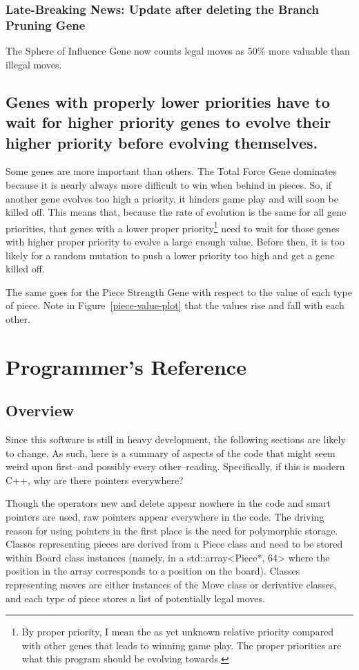 \documentclass[letterpaper]{article}
\newcommand{\cpp}{C{\nobreak +}{\nobreak +}}
\newcommand{\code}[1]{\textsf{#1}}
\renewcommand{\_}{\allowbreak\textunderscore\allowbreak}
\begin{document}
\subsubsection{Late-Breaking News: Update after deleting the Branch Pruning Gene}
The Sphere of Influence Gene now counts legal moves as 50\% more valuable than illegal moves.

\subsection{Genes with properly lower priorities have to wait for higher priority genes to evolve their higher priority before evolving themselves.}
\label{lower-priority-waits}

Some genes are more important than others. The Total Force Gene dominates because it is nearly always more difficult to win when behind in pieces. So, if another gene evolves too high a priority, it hinders game play and will soon be killed off. This means that, because the rate of evolution is the same for all gene priorities, that genes with a lower proper priority\footnote{By proper priority, I mean the as yet unknown relative priority compared with other genes that leads to winning game play. The proper priorities are what this program should be evolving towards.} need to wait for those genes with higher proper priority to evolve a large enough value. Before then, it is too likely for a random mutation to push a lower priority too high and get a gene killed off.

The same goes for the Piece Strength Gene with respect to the value of each type of piece. Note in Figure~\ref{piece-value-plot} that the values rise and fall with each other.

\section{Programmer's Reference}

\subsection{Overview}

Since this software is still in heavy development, the following sections are likely to change. As such, here is a summary of aspects of the code that might seem weird upon first--and possibly every other--reading. Specifically, if this is modern \cpp{}, why are there pointers everywhere?

Though the operators \code{new} and \code{delete} appear nowhere in the code and smart pointers are used, raw pointers appear everywhere in the code. The driving reason for using pointers in the first place is the need for polymorphic storage. Classes representing pieces are derived from a \code{Piece} class and need to be stored within \code{Board} class instances (namely, in a \code{std::array<Piece*, 64>} where the position in the array corresponds to a position on the board). Classes representing moves are either instances of the \code{Move} class or derivative classes, and each type of piece stores a list of potentially legal moves.
\end{document}
